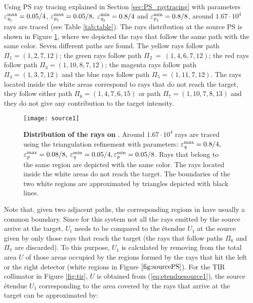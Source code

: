 \\ \indent
Using PS ray tracing explained in Section \ref{sec:PS_raytracing} with parameters $\varepsilon_{\textit{q}_1}^{\textrm{max}} = 0.05/4$, $ \varepsilon_{\textit{p}_1}^\textrm{max} = 0.05/8, $ $\varepsilon_{\textit{q}_1}^\textrm{min} = 0.8/4$ and $\varepsilon_{\textit{p}_1}^\textrm{min} = 0.8/8$, around $1.67 \cdot 10^4$ rays are traced (see Table \ref{tab:table}). The rays distribution at the source PS is shown in Figure \ref{fig:sourcePS}, where we depicted the rays that follow the same path with the same color. Seven different paths are found. The yellow rays follow path $\Pi_1 = (1, 2, 7, 12)$; the green rays follow path $\Pi_2 ~= ~(1, 4, 6, 7, 12)$; the red rays follow path $\Pi_3 = (1, 10, 8, 7, 12)$; the magenta rays follow path $\Pi_4= (1, 3, 7, 12)$ and the blue rays follow path $\Pi_5= (1, 11, 7, 12)$. The rays located inside the white areas correspond to rays that do not reach the target, they follow either path $\Pi_6 = (1, 4, 7, 6, 15)$ or path $\Pi_7 = (1,10,7,8,13)$ and they do not give any contribution to the target intensity.
\begin{figure}[t]
\label{fig:sourcePS}
  \begin{center}
  \texttt{[image: source1]}
  \end{center}
  \caption{\textbf{Distribution of the rays on }. Around $1.67 \cdot 10^4$ rays are traced using the triangulation refinement with parameters:
  $\varepsilon_{\textit{q}}^\textrm{max} = 0.8/4 ,$ $ \varepsilon_{\textit{p}}^\textrm{max} = 0.08/8, $ $\varepsilon_{\textit{q}}^\textrm{min} = 0.05/4, \varepsilon_{\textit{p}}^\textrm{min} = 0.05/8$. Rays that belong to the same region are depicted with the same color. The rays located inside the white areas do not reach the target. The boundaries of the two white regions are approximated by triangles depicted with black lines.}
 \label{fig:sourcePS}
\end{figure}
Note that, given two adjacent paths, the corresponding regions in  have usually a common boundary. 
Since for this system not all the rays emitted by the source arrive at the target, $U_{\textrm{t}}$ needs to be compared to the \'{e}tendue $U_1$ at the source given by only those rays that reach the target (the rays that follow paths $\Pi_6$ and 
$\Pi_7$ are discarded). To this purpose, $U_1$ is calculated by removing from the total area $U$ of  those areas occupied by the regions formed by the rays that hit the left or the right detector (white regions in Figure $\ref{fig:sourcePS}$).  For the TIR collimator in Figure \ref{fig:tir}, $U$ is obtained from (\ref{eq:etenduesource1}), the source \'{e}tendue $U_1$ corresponding to the area covered by the rays that arrive at the target can be approximated by:
